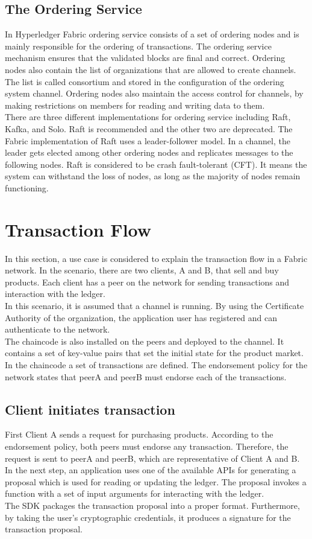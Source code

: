 \documentclass[sigconf,natbib=false]{acmart}
\begin{document}
    \subsection{The Ordering Service}
    In Hyperledger Fabric ordering service consists of a set of ordering nodes and is mainly responsible for the ordering of transactions. The ordering service mechanism ensures that the validated blocks are final and correct.
    Ordering nodes also contain the list of organizations that are allowed to create channels. The list is called consortium and stored in the configuration of the ordering system channel. Ordering nodes also maintain the access control for channels, by making restrictions on members for reading and writing data to them.\\
    There are three different implementations for ordering service including Raft, Kafka, and Solo. Raft is recommended and the other two are deprecated. The Fabric implementation of Raft uses a leader-follower model. In a channel, the leader gets elected among other ordering nodes and replicates messages to the following nodes. Raft is considered to be crash fault-tolerant (CFT). It means the system can withstand the loss of nodes, as long as the majority of nodes remain functioning.\cite{orderService}

    \section{Transaction Flow}
    In this section, a use case is considered to explain the transaction flow in a Fabric network. In the scenario, there are two clients, A and B, that sell and buy products. Each client has a peer on the network for sending transactions and interaction with the ledger.\\
    In this scenario, it is assumed that a channel is running. By using the Certificate Authority of the organization, the application user has registered and can authenticate to the network.\\
    The chaincode is also installed on the peers and deployed to the channel. It contains a set of key-value pairs that set the initial state for the product market. In the chaincode a set of transactions are defined. The endorsement policy for the network states that peerA and peerB must endorse each of the transactions\cite{transactionFlow}.
    \subsection{Client initiates transaction}
    First Client A sends a request for purchasing products. According to the endorsement policy, both peers must endorse any transaction. Therefore, the request is sent to peerA and peerB, which are representative of Client A and B.\\
    In the next step, an application uses one of the available APIs for generating a proposal which is used for reading or updating the ledger. The proposal invokes a function with a set of input arguments for interacting with the ledger.\\
    The SDK packages the transaction proposal into a proper format. Furthermore, by taking the user's cryptographic credentials, it produces a signature for the transaction proposal.
\end{document}
